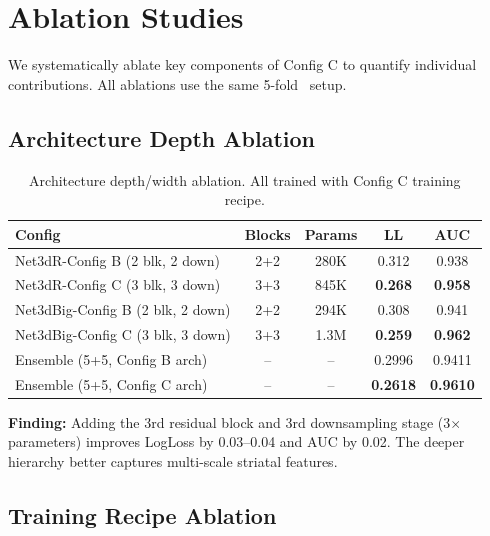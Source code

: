 \section{Ablation Studies}
\label{sec:ablation}

We systematically ablate key components of Config C to quantify individual contributions. All ablations use the same 5-fold \cvname~setup.

\subsection{Architecture Depth Ablation}
\label{sec:arch_ablation}

\begin{table}[H]
\centering
\caption{Architecture depth/width ablation. All trained with Config C training recipe.}
\label{tab:arch_ablation}
\begin{tabular}{lcccc}
\toprule
\textbf{Config} & \textbf{Blocks} & \textbf{Params} & \textbf{LL} & \textbf{AUC} \\
\midrule
Net3dR-Config B (2 blk, 2 down) & 2+2 & 280K & 0.312 & 0.938 \\
Net3dR-Config C (3 blk, 3 down) & 3+3 & 845K & \textbf{0.268} & \textbf{0.958} \\
Net3dBig-Config B (2 blk, 2 down) & 2+2 & 294K & 0.308 & 0.941 \\
Net3dBig-Config C (3 blk, 3 down) & 3+3 & 1.3M & \textbf{0.259} & \textbf{0.962} \\
\midrule
Ensemble (5+5, Config B arch) & -- & -- & 0.2996 & 0.9411 \\
Ensemble (5+5, Config C arch) & -- & -- & \textbf{0.2618} & \textbf{0.9610} \\
\bottomrule
\end{tabular}
\end{table}

\textbf{Finding:} Adding the 3rd residual block and 3rd downsampling stage (3$\times$ parameters) improves LogLoss by 0.03--0.04 and AUC by 0.02. The deeper hierarchy better captures multi-scale striatal features.

\subsection{Training Recipe Ablation}
\label{sec:training_ablation}

